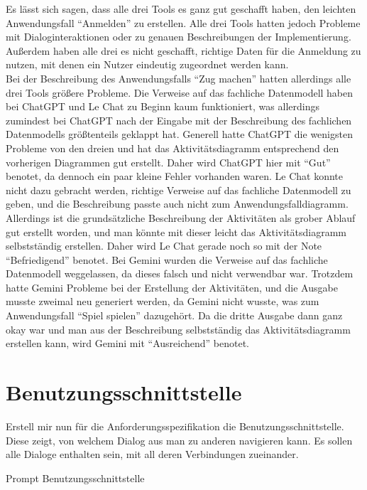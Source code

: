 Es lässt sich sagen, dass alle drei Tools es ganz gut geschafft haben, den leichten Anwendungsfall ``Anmelden'' zu erstellen. Alle drei Tools 
hatten jedoch Probleme mit Dialoginteraktionen oder zu genauen Beschreibungen der Implementierung. Außerdem haben alle drei es nicht geschafft, 
richtige Daten für die Anmeldung zu nutzen, mit denen ein Nutzer eindeutig zugeordnet werden kann.\\
Bei der Beschreibung des Anwendungsfalls ``Zug machen'' hatten allerdings alle drei Tools größere Probleme. Die Verweise auf das fachliche 
Datenmodell haben bei ChatGPT und Le Chat zu Beginn kaum funktioniert, was allerdings zumindest bei ChatGPT nach der Eingabe mit der Beschreibung 
des fachlichen Datenmodells größtenteils geklappt hat. Generell hatte ChatGPT die wenigsten Probleme von den dreien und hat das Aktivitätsdiagramm 
entsprechend den vorherigen Diagrammen gut erstellt. Daher wird ChatGPT hier mit ``Gut'' benotet, da dennoch ein paar kleine Fehler vorhanden 
waren. Le Chat konnte nicht dazu gebracht werden, richtige Verweise auf das fachliche Datenmodell zu geben, und die Beschreibung passte auch 
nicht zum Anwendungsfalldiagramm. Allerdings ist die grundsätzliche Beschreibung der Aktivitäten als grober Ablauf gut erstellt worden, und man 
könnte mit dieser leicht das Aktivitätsdiagramm selbstständig erstellen. Daher wird Le Chat gerade noch so mit der Note ``Befriedigend'' benotet. 
Bei Gemini wurden die Verweise auf das fachliche Datenmodell weggelassen, da dieses falsch und nicht verwendbar war. Trotzdem hatte Gemini 
Probleme bei der Erstellung der Aktivitäten, und die Ausgabe musste zweimal neu generiert werden, da Gemini nicht wusste, was zum Anwendungsfall 
``Spiel spielen'' dazugehört. Da die dritte Ausgabe dann ganz okay war und man aus der Beschreibung selbstständig das Aktivitätsdiagramm erstellen 
kann, wird Gemini mit ``Ausreichend'' benotet.

\section*{Benutzungsschnittstelle}

\begin{prompt}[H]
    \begin{tcolorbox}[colback=gray!20, colframe=gray!20, boxrule=0pt, sharp corners] 
        Erstell mir nun für die Anforderungsspezifikation die Benutzungsschnittstelle. Diese zeigt, von welchem Dialog aus man zu anderen 
        navigieren kann. Es sollen alle Dialoge enthalten sein, mit all deren Verbindungen zueinander.
        \vfill
    \end{tcolorbox}
    \caption{Prompt Benutzungsschnittstelle}
    \label{Prompt Benutzungsschnittstelle}
\end{prompt}

